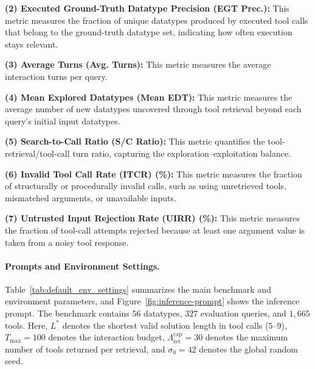 
\noindent \textbf{(2) Executed Ground-Truth Datatype Precision (EGT Prec.):} This metric measures the fraction of unique datatypes produced by executed tool calls that belong to the ground-truth datatype set, indicating how often execution stays relevant.

\noindent \textbf{(3) Average Turns (Avg. Turns):} This metric measures the average interaction turns per query.

\noindent \textbf{(4) Mean Explored Datatypes (Mean EDT):} This metric measures the average number of new datatypes uncovered through tool retrieval beyond each query’s initial input datatypes.

\noindent \textbf{(5) Search-to-Call Ratio (S/C Ratio):} This metric quantifies the tool-retrieval/tool-call turn ratio, capturing the exploration–exploitation balance.


\noindent \textbf{(6) Invalid Tool Call Rate (ITCR) (\%):} This metric measures the fraction of structurally or procedurally invalid calls, such as using unretrieved tools, mismatched arguments, or unavailable inputs.

\noindent \textbf{(7) Untrusted Input Rejection Rate (UIRR) (\%):} This metric measures the fraction of tool-call attempts rejected because at least one argument value is taken from a noisy tool response.




\paragraph{Prompts and Environment Settings.}
Table~\ref{tab:default_env_settings} summarizes the main benchmark and environment parameters, and Figure~\ref{fig:inference-prompt} shows the inference prompt.
The benchmark contains $56$ datatypes, $327$ evaluation queries, and $1{,}665$ tools.
Here, $L^*$ denotes the shortest valid solution length in tool calls ($5$--$9$), $T_{\max}=100$ denotes the interaction budget, $\Lambda_{\mathrm{ret}}^{\mathrm{cap}}=30$ denotes the maximum number of tools returned per retrieval, and $\sigma_0=42$ denotes the global random seed.




